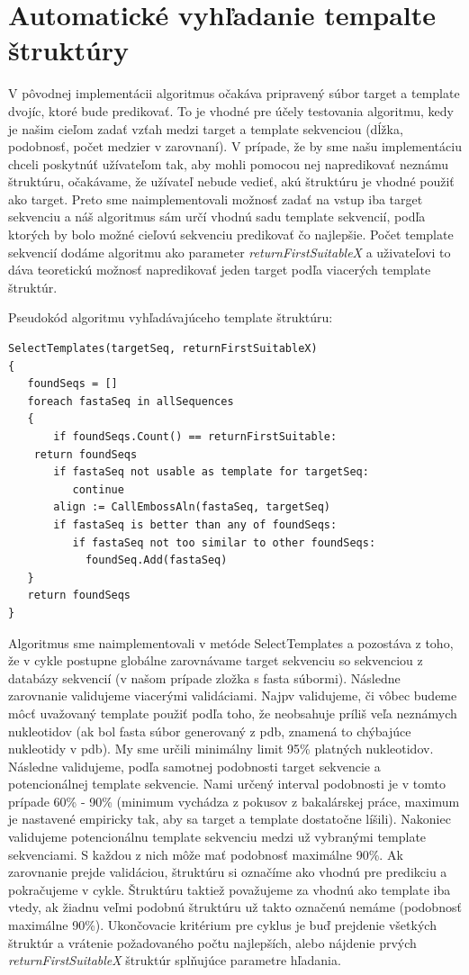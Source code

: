 \section{Automatické vyhľadanie tempalte štruktúry}
V pôvodnej implementácii  algoritmus očakáva pripravený súbor target a template dvojíc, ktoré bude predikovať. To je vhodné pre účely testovania algoritmu, kedy je našim cieľom zadať vzťah medzi target a template sekvenciou (dĺžka, podobnosť, počet medzier v zarovnaní). V prípade, že by sme našu implementáciu chceli poskytnúť užívateľom tak, aby mohli pomocou nej napredikovať neznámu štruktúru, očakávame, že užívateľ nebude vedieť, akú štruktúru je vhodné použiť ako target. Preto sme naimplementovali možnosť zadať na vstup iba target sekvenciu a náš algoritmus sám určí vhodnú sadu template sekvencií, podľa ktorých by bolo možné cieľovú sekvenciu predikovať čo najlepšie. Počet template sekvencií dodáme algoritmu ako parameter \textit{returnFirstSuitableX} a uživateľovi to dáva teoretickú možnosť napredikovať jeden target podľa viacerých template štruktúr.


\indent Pseudokód algoritmu vyhľadávajúceho template štruktúru:
\lstset{numbers=left, numberstyle=\tiny, stepnumber=1, numbersep=5pt}
\begin{lstlisting}
SelectTemplates(targetSeq, returnFirstSuitableX)
{
   foundSeqs = []
   foreach fastaSeq in allSequences 
   {
       if foundSeqs.Count() == returnFirstSuitable:
	return foundSeqs
       if fastaSeq not usable as template for targetSeq:
          continue
       align := CallEmbossAln(fastaSeq, targetSeq)
       if fastaSeq is better than any of foundSeqs:
          if fastaSeq not too similar to other foundSeqs:
            foundSeq.Add(fastaSeq)
   }		
   return foundSeqs
}
\end{lstlisting}


\indent Algoritmus sme naimplementovali v metóde SelectTemplates a pozostáva z toho, že v cykle postupne globálne zarovnávame target sekvenciu so sekvenciou z databázy sekvencií (v našom prípade zložka s fasta súbormi). Následne  zarovnanie validujeme viacerými validáciami. Najpv validujeme, či vôbec budeme môcť uvažovaný template použiť podľa toho, že neobsahuje príliš veľa neznámych nukleotidov (ak  bol fasta súbor generovaný z pdb, znamená to chýbajúce nukleotidy v pdb). My sme určili minimálny limit 95\% platných nukleotidov. Následne validujeme, podľa samotnej podobnosti target sekvencie a potencionálnej template sekvencie. Nami určený interval podobnosti je v tomto prípade 60\% - 90\% (minimum vychádza z pokusov z bakalárskej práce, maximum je nastavené empiricky tak, aby sa target a template dostatočne líšili). Nakoniec validujeme potencionálnu template sekvenciu medzi už vybranými template sekvenciami. S každou z nich môže mať podobnosť maximálne 90\%. Ak zarovnanie prejde validáciou, štruktúru si označíme ako vhodnú pre predikciu a pokračujeme v cykle. Štruktúru taktiež považujeme za vhodnú ako template iba vtedy, ak  žiadnu veľmi podobnú štruktúru už takto označenú nemáme (podobnosť maximálne 90\%). Ukončovacie kritérium pre cyklus je buď prejdenie všetkých štruktúr a vrátenie požadovaného počtu najlepších, alebo nájdenie prvých \textit{returnFirstSuitableX} štruktúr splňujúce parametre hľadania.


